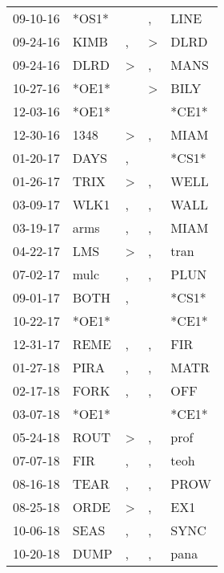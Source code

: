 \begin{supertabular}{lllll}
 09-10-16 &  *OS1* &                  &                , &   LINE \\
 09-24-16 &   KIMB &                , &     \textgreater &   DLRD \\
 09-24-16 &   DLRD &     \textgreater &                , &   MANS \\
 10-27-16 &  *OE1* &                  &     \textgreater &   BILY \\
 12-03-16 &  *OE1* &                  &                  &  *CE1* \\
 12-30-16 &   1348 &     \textgreater &                , &   MIAM \\
 01-20-17 &   DAYS &                , &                  &  *CS1* \\
 01-26-17 &   TRIX &     \textgreater &                , &   WELL \\
 03-09-17 &   WLK1 &                , &                , &   WALL \\
 03-19-17 &   arms &                , &                , &   MIAM \\
 04-22-17 &    LMS &     \textgreater &                , &   tran \\
 07-02-17 &   mulc &                , &                , &   PLUN \\
 09-01-17 &   BOTH &                , &                  &  *CS1* \\
 10-22-17 &  *OE1* &                  &                  &  *CE1* \\
 12-31-17 &   REME &                , &                , &    FIR \\
 01-27-18 &   PIRA &                , &                , &   MATR \\
 02-17-18 &   FORK &                , &                , &    OFF \\
 03-07-18 &  *OE1* &                  &                  &  *CE1* \\
 05-24-18 &   ROUT &     \textgreater &                , &   prof \\
 07-07-18 &    FIR &                , &                , &   teoh \\
 08-16-18 &   TEAR &                , &                , &   PROW \\
 08-25-18 &   ORDE &     \textgreater &                , &    EX1 \\
 10-06-18 &   SEAS &                , &                , &   SYNC \\
 10-20-18 &   DUMP &                , &                , &   pana \\

\end{supertabular}
